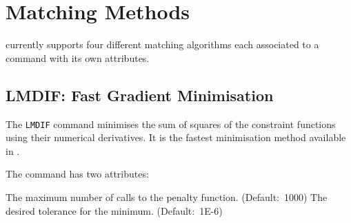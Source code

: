 \begin{table}[ht]
\begin{center}
\begin{tabular}{|lr|lr|lr|}
      \hline
    \end{tabular}
  \end{center}
\end{table}




%

\section{Matching Methods}
\label{sec:match-methods}

\madx currently supports four different matching algorithms each associated to 
a command with its own attributes. 

\subsection{LMDIF: Fast Gradient Minimisation}
\label{subsec:match-lmdif}
The {\tt LMDIF} command minimises the sum of squares of the constraint
functions using their numerical derivatives. It is the fastest
minimisation method available in \madx.
 

The command has two attributes:  
\begin{madlist}
    The maximum number of calls to the penalty
   function. (Default:~1000) 
    The desired tolerance for the minimum. 
   (Default:~1E-6)  
\end{madlist}

